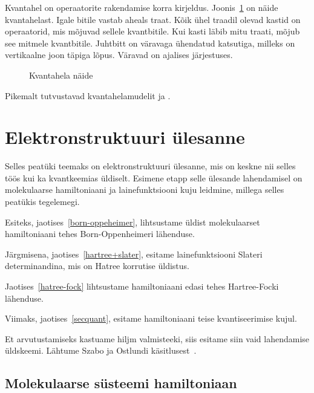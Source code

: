 \documentclass[12pt]{article}
\begin{document}
Kvantahel on operaatorite rakendamise korra kirjeldus.
Joonis~\ref{fig:circuits} on näide kvantahelast.
Igale bitile vastab aheals traat.
Kõik ühel traadil olevad kastid on operaatorid, mis mõjuvad sellele kvantbitile.
Kui kasti läbib mitu traati, mõjub see mitmele kvantbitile.
Juhtbitt on väravaga ühendatud katsutiga, milleks on vertikaalne joon täpiga lõpus.
Väravad on ajalises järjestuses.

\begin{figure}
    \centering
    \caption{Kvantahela näide}
    \label{fig:circuits}
\end{figure}

Pikemalt tutvustavad kvantahelamudelit \cite{nielsen+chuang} ja \cite{kaye+laflamme+mosca}.


\newpage\section{Elektronstruktuuri ülesanne}

Selles peatüki teemaks on elektronstruktuuri ülesanne, mis on keskne nii selles töös kui ka kvantkeemias üldiselt.
Esimene etapp selle ülesande lahendamisel on molekulaarse hamiltoniaani ja lainefunktsiooni kuju leidmine, millega selles peatükis tegelemegi.

Esiteks, jaotises~\ref{born-oppeheimer}, lihtsustame üldist molekulaarset hamiltoniaani tehes Born-Oppenheimeri lähenduse.

Järgmisena, jaotises~\ref{hartree+slater}, esitame lainefunktsiooni Slateri determinandina, mis on Hatree korrutise üldistus.

Jaotises~\ref{hatree-fock} lihtsustame hamiltoniaani edasi tehes Hartree-Focki lähenduse.

Viimaks, jaotises~\ref{secquant}, esitame hamiltoniaani teise kvantiseerimise kujul.

Et arvutustamiseks kastuame hiljm valmisteeki, siis esitame siin vaid lahendamise üldskeemi.
Lähtume Szabo ja Ostlundi käsitlusest~\cite{szabo+ostlund}.

\subsection{Molekulaarse süsteemi hamiltoniaan}
\end{document}
